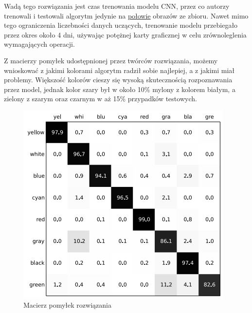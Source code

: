 Wadą tego rozwiązania jest czas trenowania modelu CNN, przez co autorzy trenowali i testowali algorytm jedynie na \underline{połowie} obrazów ze zbioru. Nawet mimo tego ograniczenia liczebności danych uczących, trenowanie modelu przebiegało przez okres około 4 dni, używając potężnej karty graficznej w celu zrównoleglenia wymagających operacji.

Z macierzy pomyłek udostępnionej przez twórców rozwiązania, możemy wnioskować z jakimi kolorami algorytm radził sobie najlepiej, a z jakimi miał problemy. Większość kolorów cieszy się wysoką skutecznością rozpoznawania przez model, jednak kolor szary był w około 10\% mylony z kolorem białym, a zielony z szarym oraz czarnym w aż 15\% przypadków testowych.

\begin{figure}[h!]
    \begin{center}
        \includegraphics[scale=1.2]{img/confusion_cnn.png}
    \end{center}
    \caption{Macierz pomyłek rozwiązania}    
    \label{fig:confusion_cnn}
\end{figure}


